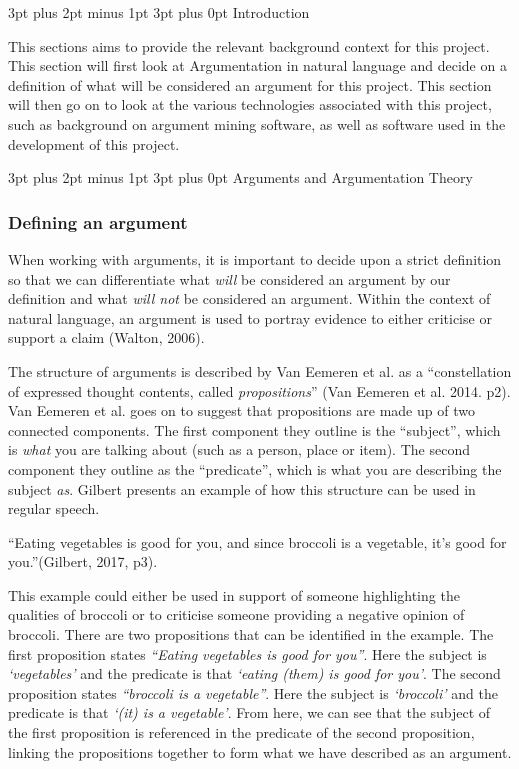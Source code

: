 \documentclass[12pt,a4paper]{article}
\makeatletter
\renewcommand\subsection{\@startsection {subsection}{1}{2mm} %
                               {3pt plus 2pt minus 1pt} %
                               {3pt plus 0pt} %
                               {\normalfont\bfseries}}
\makeatother
\begin{document}
\subsection{Introduction}

This sections aims to provide the relevant background context for this project. This section will first look at Argumentation in natural language and decide on a definition of what will be considered an argument for this project. This section will then go on to look at the various technologies associated with this project, such as background on argument mining software, as well as software used in the development of this project.

\subsection{Arguments and Argumentation Theory}

\subsubsection{Defining an argument}
When working with arguments, it is important to decide upon a strict definition so that we can differentiate what \emph{will} be considered an argument by our definition and what \emph{will not} be considered an argument. Within the context of natural language, an argument is used to portray evidence to either criticise or support a claim (Walton, 2006). 

The structure of arguments is described by Van Eemeren et al. as a ``constellation of expressed thought contents, called \emph{propositions}'' (Van Eemeren et al. 2014. p2). Van Eemeren et al. goes on to suggest that propositions are made up of two connected components. The first component they outline is the ``subject'', which is \emph{what} you are talking about (such as a person, place or item). The second component they outline as the ``predicate'', which is what you are describing the subject \emph{as}. Gilbert presents an example of how this structure can be used in regular speech.

``Eating vegetables is good for you, and since broccoli is a vegetable, it's good for you.''(Gilbert, 2017, p3).

This example could either be used in support of someone highlighting the qualities of broccoli or to criticise someone providing a negative opinion of broccoli. There are two propositions that can be identified in the example. The first proposition states \emph{``Eating vegetables is good for you''}. Here the subject is \emph{`vegetables'} and the predicate is that \emph{`eating (them) is good for you'}. The second proposition states \emph{``broccoli is a vegetable''}. Here the subject is \emph{`broccoli'} and the predicate is that \emph{`(it) is a vegetable'}.  From here, we can see that the subject of the first proposition is referenced in the predicate of the second proposition, linking the propositions together to form what we have described as an argument.
\end{document}
